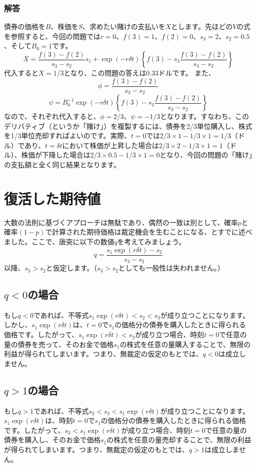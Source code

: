 \documentclass[uplatex,a4j,12pt,dvipdfmx]{jsarticle}
\begin{document}
\subsubsection{解答}
債券の価格を$B$、株価を$S$、求めたい賭けの支払いを$X$とします。先ほどの$V$の式を参照すると、今回の問題では$r=0$、$f(3)=1$、$f(2)=0$、$s_3=2$、$s_2=0.5$、そして$B_0=1$です。
\[X = \frac{f(3) - f(2)}{s_3 - s_2} s_1 + \exp(-r\delta t) \left\{ f(3) - s_3 \frac{f(3) - f(2)}{s_3 - s_2} \right\}\]
代入すると$X = 1/3$となり、この問題の答えは0.33ドルです。
また、
\[\phi = \frac{f(3) - f(2)}{s_3 - s_2}\]
\[\psi = B_0^{-1} \exp(-r\delta t) \left\{ f(3) - s_3 \frac{f(3) - f(2)}{s_3 - s_2} \right\}\]
なので、それぞれ代入すると、$\phi =2/3$、$\psi=-1/3$となります。すなわち、このデリバティブ（というか「賭け」）を複製するには、債券を2/3単位購入し、株式を1/3単位売却すればよいのです。実際、$t=0$では$2/3 \times 1 - 1/3 \times 1 = 1/3$（ドル）であり、$t=\delta t$において株価が上昇した場合は$2/3 \times 2 - 1/3 \times 1 = 1$（ドル）、株価が下降した場合は$2/3 \times 0.5 - 1/3 \times 1 = 0$となり、今回の問題の「賭け」の支払額と全く同じ結果となります。

\section{復活した期待値}
大数の法則に基づくアプローチは無駄であり、偶然の一致は別として、確率$p$と確率$(1-p)$で計算された期待価格は裁定機会を生むことになる、とすでに述べました。ここで、唐突に以下の数値$q$を考えてみましょう。
\[q = \frac{s_1 \exp(r\delta t) - s_2}{s_3 - s_2}\]
以降、$s_3 > s_2$と仮定します。（$s_3 > s_2$としても一般性は失われません。）

\subsection{$q < 0$の場合}
もし$q<0$であれば、不等式$s_1 \exp(r\delta t) < s_2 < s_3$が成り立つことになります。しかし、$s_1 \exp(r\delta t)$は、$t=0$で$s_1$の価格分の債券を購入したときに得られる価格です。したがって、$s_1 \exp(r\delta t) < s_2$が成り立つ場合、時刻$t=0$で任意の量の債券を売って、そのお金で価格$s_1$の株式を任意の量購入することで、無限の利益が得られてしまいます。つまり、無裁定の仮定のもとでは、$q<0$は成立しません。

\subsection{$q > 1$の場合}
もし$q>1$であれば、不等式$s_2 < s_3 < s_1 \exp(r\delta t)$が成り立つことになります。$s_1 \exp(r\delta t)$は、時刻$t=0$で$s_1$の価格分の債券を購入したときに得られる価格です。したがって、$s_3 < s_1 \exp(r\delta t)$が成り立つ場合、時刻$t=0$で任意の量の債券を購入し、そのお金で価格$s_1$の株式を任意の量売却することで、無限の利益が得られてしまいます。つまり、無裁定の仮定のもとでは、$q>1$は成立しません。
\end{document}
